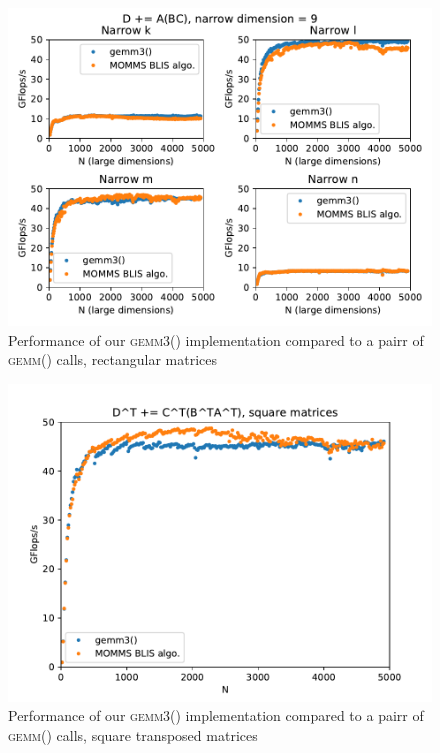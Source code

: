 \documentclass[12pt]{article}
\newcommand*{\gemmt}{{\textsc{gemm3()}}}
\newcommand*{\gemm}{{\textsc{gemm()}}}
\begin{document}
\begin{figure}
  \centering
  \includegraphics[height=0.40\textheight]{../results/earwig2/gemm3_rectangles}
  \caption{Performance of our \gemmt{} implementation compared to a pairr of \gemm{} calls, rectangular matrices}
  \label{fig:bc_rectangles}
\end{figure}

\begin{figure}
  \centering
  \includegraphics[height=0.40\textheight]{../results/earwig2/gemm3_ab_bc_kernel}
  \caption{Performance of our \gemmt{} implementation compared to a pairr of \gemm{} calls, square transposed matrices}
  \label{fig:ab_square}
\end{figure}
\end{document}
